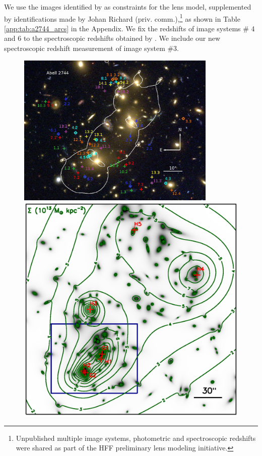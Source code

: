 We use the images identified by \citet{Merten:2011fk} as constraints for the lens model, supplemented by identifications made by Johan Richard (priv. comm.),\footnote{\label{note}Unpublished multiple image systems, photometric and spectroscopic redshifts were shared as part of the HFF preliminary lens modeling initiative.} as shown in Table \ref{app:tab:a2744_arcs} in the Appendix. We fix the redshifts of image systems \# 4 and 6 to the spectroscopic redshifts obtained by  \citet{Richard:2014gf}. We include our new spectroscopic redshift measurement of image system \#3.

\begin{figure}[h]
\centering
\includegraphics[width=0.85\textwidth]{Chap2/c2f1a.eps} \\
\includegraphics[height=0.28\textheight]{Chap2/c2f1b.eps}

\end{figure}
